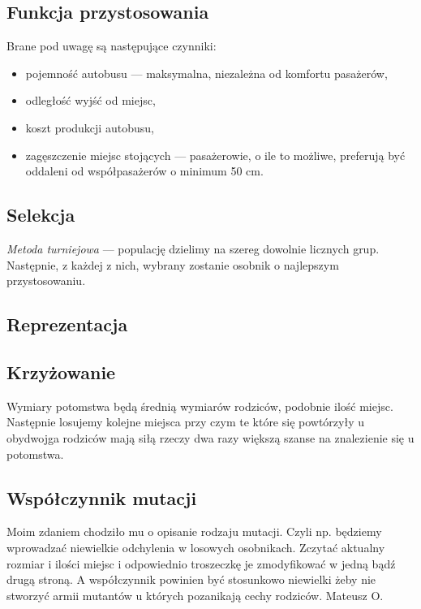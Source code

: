 \documentclass[10pt,a4paper]{article}
\begin{document}
\subsection{Funkcja przystosowania}
Brane pod uwagę są następujące czynniki:
\begin{itemize}
    \item pojemność autobusu --- maksymalna, niezależna od komfortu pasażerów,
    \item odległość wyjść od miejsc,
    \item koszt produkcji autobusu,
    \item zagęszczenie miejsc stojących --- pasażerowie, o ile to możliwe,
      preferują być oddaleni od współpasażerów o minimum 50 cm.
\end{itemize}


\subsection{Selekcja}
\emph{Metoda turniejowa} --- populację dzielimy na szereg dowolnie licznych
grup. Następnie, z każdej z nich, wybrany zostanie osobnik o najlepszym
przystosowaniu.


\subsection{Reprezentacja} 


\subsection{Krzyżowanie}
Wymiary potomstwa będą średnią wymiarów rodziców, podobnie ilość miejsc.
Następnie losujemy kolejne miejsca przy czym te które się powtórzyły u obydwojga
rodziców mają siłą rzeczy dwa razy większą szanse na znalezienie się u
potomstwa.

\subsection{Współczynnik mutacji}
Moim zdaniem chodziło mu o opisanie rodzaju mutacji. Czyli np. będziemy
wprowadzać niewielkie odchylenia w losowych osobnikach. Zczytać aktualny
rozmiar i ilości miejsc i odpowiednio troszeczkę je zmodyfikować w jedną bądź
drugą stroną.  A współczynnik powinien być stosunkowo niewielki żeby nie
stworzyć armii mutantów u których pozanikają cechy rodziców. Mateusz O. 
\end{document}
